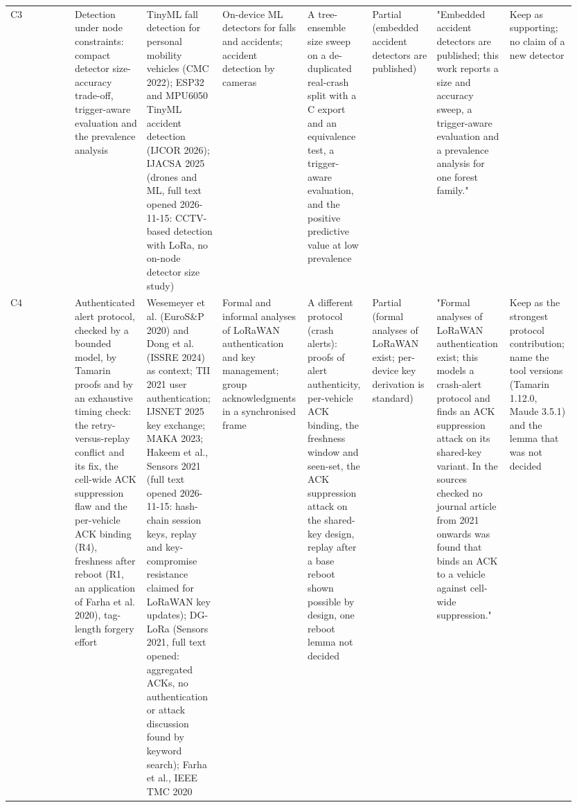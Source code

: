 {\begin{longtable}{p{0.119\linewidth}p{0.119\linewidth}p{0.119\linewidth}p{0.119\linewidth}p{0.119\linewidth}p{0.119\linewidth}p{0.119\linewidth}p{0.119\linewidth}}
C3 & Detection under node constraints: compact detector size-accuracy trade-off, trigger-aware evaluation and the prevalence analysis & TinyML fall detection for personal mobility vehicles (CMC 2022); ESP32 and MPU6050 TinyML accident detection (IJCOR 2026); IJACSA 2025 (drones and ML, full text opened 2026-11-15: CCTV-based detection with LoRa, no on-node detector size study) & On-device ML detectors for falls and accidents; accident detection by cameras & A tree-ensemble size sweep on a de-duplicated real-crash split with a C export and an equivalence test, a trigger-aware evaluation, and the positive predictive value at low prevalence & Partial (embedded accident detectors are published) & "Embedded accident detectors are published; this work reports a size and accuracy sweep, a trigger-aware evaluation and a prevalence analysis for one forest family." & Keep as supporting; no claim of a new detector \\
C4 & Authenticated alert protocol, checked by a bounded model, by Tamarin proofs and by an exhaustive timing check: the retry-versus-replay conflict and its fix, the cell-wide ACK suppression flaw and the per-vehicle ACK binding (R4), freshness after reboot (R1, an application of Farha et al. 2020), tag-length forgery effort & Wesemeyer et al. (EuroS\&P 2020) and Dong et al. (ISSRE 2024) as context; TII 2021 user authentication; IJSNET 2025 key exchange; MAKA 2023; Hakeem et al., Sensors 2021 (full text opened 2026-11-15: hash-chain session keys, replay and key-compromise resistance claimed for LoRaWAN key updates); DG-LoRa (Sensors 2021, full text opened: aggregated ACKs, no authentication or attack discussion found by keyword search); Farha et al., IEEE TMC 2020 & Formal and informal analyses of LoRaWAN authentication and key management; group acknowledgments in a synchronised frame & A different protocol (crash alerts): proofs of alert authenticity, per-vehicle ACK binding, the freshness window and seen-set, the ACK suppression attack on the shared-key design, replay after a base reboot shown possible by design, one reboot lemma not decided & Partial (formal analyses of LoRaWAN exist; per-device key derivation is standard) & "Formal analyses of LoRaWAN authentication exist; this models a crash-alert protocol and finds an ACK suppression attack on its shared-key variant. In the sources checked no journal article from 2021 onwards was found that binds an ACK to a vehicle against cell-wide suppression." & Keep as the strongest protocol contribution; name the tool versions (Tamarin 1.12.0, Maude 3.5.1) and the lemma that was not decided \\

\end{longtable}}
